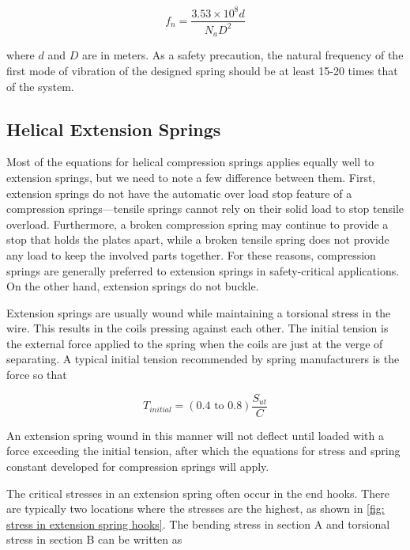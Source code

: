 \documentclass[
10pt,
a4paper,
openany,
svgnames,
]{book}
\begin{document}
\begin{equation}
  f_n = \frac{3.53 \times 10^8d}{N_aD^2}
\end{equation}

where $d$ and $D$ are in meters.
As a safety precaution, the natural frequency of the first mode of vibration of the designed spring should be at least 15-20 times that of the system.

\subsection{Helical Extension Springs}

Most of the equations for helical compression springs applies equally well to extension springs, but we need to note a few difference between them. First, extension springs do not have the automatic over load stop feature of a compression springs—tensile springs cannot rely on their solid load to stop tensile overload. Furthermore, a broken compression spring may continue to provide a stop that holds the plates apart, while a broken tensile spring does not provide any load to keep the involved parts together. For these reasons, compression springs are generally preferred to extension springs in safety-critical applications. On the other hand, extension springs do not buckle.

Extension springs are usually wound while maintaining a torsional stress in the wire. This results in the coils pressing against each other. The initial tension is the external force applied to the spring when the coils are just at the verge of separating. A typical initial tension recommended by spring manufacturers is the force so that

\begin{equation}
  T_{initial} = (0.4 \text{ to } 0.8)\frac{S_{ut}}{C}
\end{equation}

An extension spring wound in this manner will not deflect until loaded with a force exceeding the initial tension, after which the equations for stress and spring constant developed for compression springs will apply.

The critical stresses in an extension spring often occur in the end hooks. There are typically two locations where the stresses are the highest, as shown in \cref{fig: stress in extension spring hooks}. The bending stress in section A and torsional stress in section B can be written as
\end{document}
